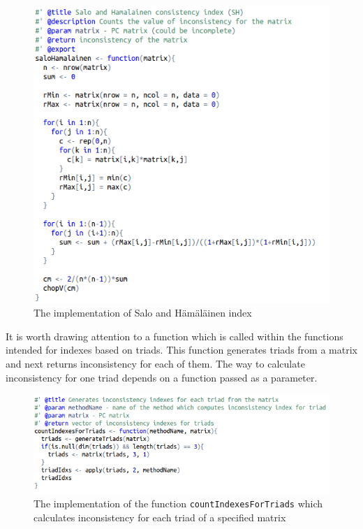 \begin{figure}[!]
\centerline{\includegraphics[scale=0.75]{images/kod4.png}}
\caption{The implementation of Salo and Hämäläinen index}
\end{figure}
It is worth drawing attention to a function which is called within the functions intended for indexes based on triads. This function generates triads from a matrix and next returns inconsistency for each of them. The way to calculate inconsistency for one triad depends on a function passed as a parameter.

\begin{figure}[!]
\centerline{\includegraphics[scale=0.75]{images/kod5.png}}
\caption{The implementation of the function \texttt{countIndexesForTriads} which calculates inconsistency for each triad of a specified matrix}
\end{figure}

